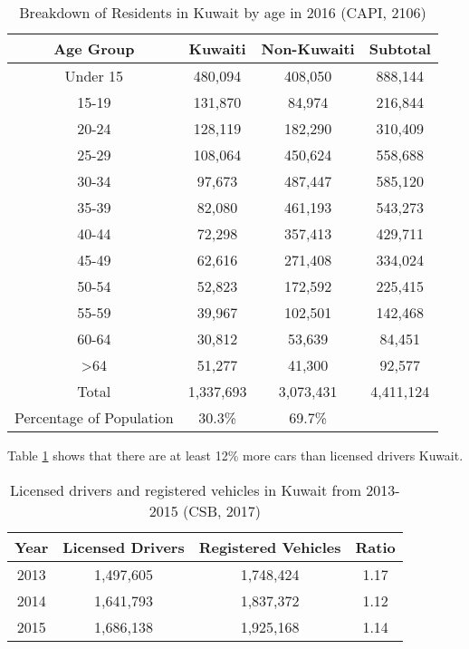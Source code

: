 \documentclass[preprint,12pt,a4paper,authoryear]{elsarticle}
\begin{document}
\begin{table}[H]
\centering
\caption{Breakdown of Residents in Kuwait by age in 2016 (CAPI, 2106)}
\label{tb:residents}
\begin{tabular}{@{}cccc@{}}
\toprule
\textbf{Age Group} & \textbf{Kuwaiti} & \textbf{Non-Kuwaiti} & \textbf{Subtotal} \\ \midrule
Under 15 & 480,094 & 408,050 & 888,144 \\
15-19 & 131,870 & 84,974 & 216,844 \\
20-24 & 128,119 & 182,290 & 310,409 \\
25-29 & 108,064 & 450,624 & 558,688 \\
30-34 & 97,673 & 487,447 & 585,120 \\
35-39 & 82,080 & 461,193 & 543,273 \\
40-44 & 72,298 & 357,413 & 429,711 \\
45-49 & 62,616 & 271,408 & 334,024 \\
50-54 & 52,823 & 172,592 & 225,415 \\
55-59 & 39,967 & 102,501 & 142,468 \\
60-64 & 30,812 & 53,639 & 84,451 \\
\textgreater64 & 51,277 & 41,300 & 92,577 \\
Total & 1,337,693 & 3,073,431 & 4,411,124 \\
Percentage of Population & 30.3\% & 69.7\% &  \\ \bottomrule
\end{tabular}
\end{table}

Table \ref{tb:residents} shows that there are at least 12\% more cars than licensed drivers Kuwait.

\begin{table}[H]
\centering
\caption{Licensed drivers and registered vehicles in Kuwait from 2013-2015 (CSB, 2017)}
\label{tb:drivers}
\begin{tabular}{@{}cccc@{}}
\toprule
\textbf{Year} & \textbf{Licensed Drivers} & \textbf{Registered Vehicles} & \textbf{Ratio} \\ \midrule
2013 & 1,497,605 & 1,748,424 & 1.17 \\
2014 & 1,641,793 & 1,837,372 & 1.12 \\
2015 & 1,686,138 & 1,925,168 & 1.14 \\ \bottomrule
\end{tabular}
\end{table}
\end{document}
